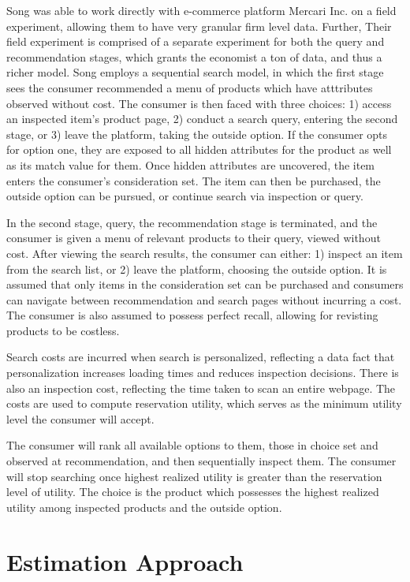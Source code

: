 \documentclass[11pt]{article}
\theoremstyle{definition}
\theoremstyle{remark}
\begin{document}
Song was able to work directly with e-commerce platform Mercari Inc. on a field experiment, allowing them to have very granular firm level data. Further,
Their field experiment is comprised of a separate experiment for both the query and recommendation stages, which grants the economist a ton of data, and
thus a richer model. Song employs a sequential search model, in which the first stage sees the consumer recommended a menu of products which have atttributes
observed without cost. The consumer is then faced with three choices: 1) access an inspected item's product page, 2) conduct a search query, entering the 
second stage, or 3) leave the platform, taking the outside option. If the consumer opts for option one, they are exposed to all hidden attributes for the 
product as well as its match value for them. Once hidden attributes are uncovered, the item enters the consumer's consideration set. The item can then be
purchased, the outside option can be pursued, or continue search via inspection or query.

In the second stage, query, the recommendation stage is terminated, and the consumer is given a menu of relevant products to their query, viewed without cost.
After viewing the search results, the consumer can either: 1) inspect an item from the search list, or 2) leave the platform, choosing the outside option. It is 
assumed that only items in the consideration set can be purchased and consumers can navigate between recommendation and search pages without incurring a cost. The
consumer is also assumed to possess perfect recall, allowing for revisting products to be costless.

Search costs are incurred when search is personalized, reflecting a data fact that personalization increases loading times and reduces inspection decisions. There is
also an inspection cost, reflecting the time taken to scan an entire webpage. The costs are used to compute reservation utility, which serves as the minimum utility
level the consumer will accept.

The consumer will rank all available options to them, those in choice set and observed at recommendation, and then sequentially inspect them. The consumer will stop
searching once highest realized utility is greater than the reservation level of utility. The choice is the product which possesses the highest realized utility among
inspected products and the outside option.

\section{Estimation Approach}
\end{document}
